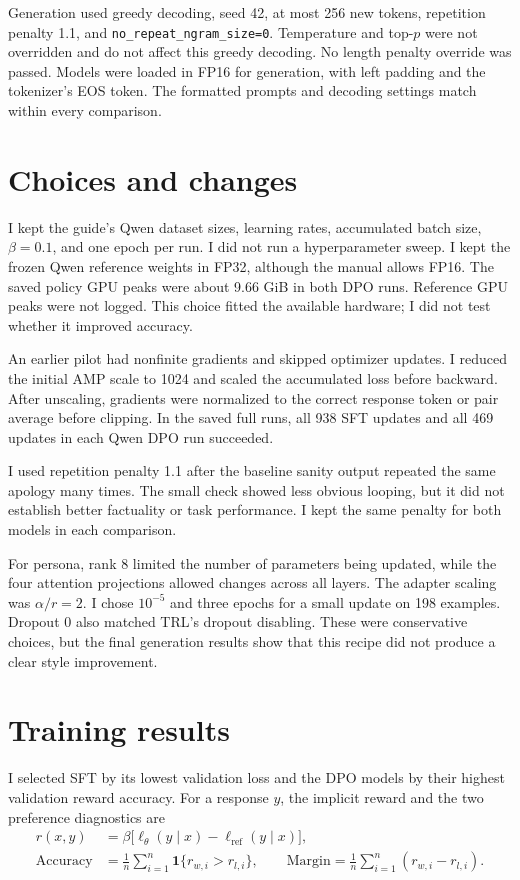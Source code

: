 \documentclass[11pt,a4paper]{article}
\newcommand{\code}[1]{\texttt{\small #1}}
\begin{document}
Generation used greedy decoding, seed 42, at most 256 new tokens, repetition penalty 1.1, and \code{no\_repeat\_ngram\_size=0}. Temperature and top-$p$ were not overridden and do not affect this greedy decoding. No length penalty override was passed. Models were loaded in FP16 for generation, with left padding and the tokenizer's EOS token. The formatted prompts and decoding settings match within every comparison.

\section{Choices and changes}

I kept the guide's Qwen dataset sizes, learning rates, accumulated batch size, $\beta=0.1$, and one epoch per run. I did not run a hyperparameter sweep. I kept the frozen Qwen reference weights in FP32, although the manual allows FP16. The saved policy GPU peaks were about 9.66 GiB in both DPO runs. Reference GPU peaks were not logged. This choice fitted the available hardware; I did not test whether it improved accuracy.

An earlier pilot had nonfinite gradients and skipped optimizer updates. I reduced the initial AMP scale to 1024 and scaled the accumulated loss before backward. After unscaling, gradients were normalized to the correct response token or pair average before clipping. In the saved full runs, all 938 SFT updates and all 469 updates in each Qwen DPO run succeeded.

I used repetition penalty 1.1 after the baseline sanity output repeated the same apology many times. The small check showed less obvious looping, but it did not establish better factuality or task performance. I kept the same penalty for both models in each comparison.

For persona, rank 8 limited the number of parameters being updated, while the four attention projections allowed changes across all layers. The adapter scaling was $\alpha/r=2$. I chose $10^{-5}$ and three epochs for a small update on 198 examples. Dropout 0 also matched TRL's dropout disabling. These were conservative choices, but the final generation results show that this recipe did not produce a clear style improvement.

\section{Training results}

I selected SFT by its lowest validation loss and the DPO models by their highest validation reward accuracy. For a response $y$, the implicit reward and the two preference diagnostics are
\begin{align}
r(x,y)&=\beta\bigl[\ell_\theta(y\mid x)-\ell_{\mathrm{ref}}(y\mid x)\bigr],\\
\mathrm{Accuracy}&=\frac{1}{n}\sum_{i=1}^{n}\mathbf{1}\{r_{w,i}>r_{l,i}\},
\qquad
\mathrm{Margin}=\frac{1}{n}\sum_{i=1}^{n}(r_{w,i}-r_{l,i}).
\end{align}
\end{document}
